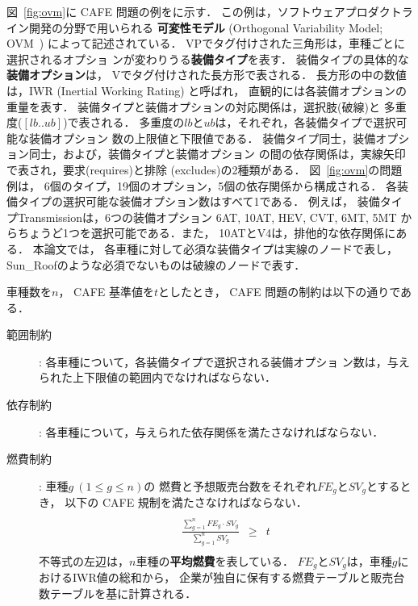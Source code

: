 
図~\ref{fig:ovm}に CAFE 問題の例をに示す．
この例は，ソフトウェアプロダクトライン開発の分野で用いられる
\textbf{可変性モデル} (Orthogonal Variability Model; OVM~\cite{Pohl05:sple})
によって記述されている．
%
\textsf{VP}でタグ付けされた三角形は，車種ごとに選択されるオプショ
ンが変わりうる\textbf{装備タイプ}を表す．
装備タイプの具体的な\textbf{装備オプション}は，
\textsf{V}でタグ付けされた長方形で表される．
長方形の中の数値は，IWR (Inertial Working Rating) と呼ばれ，
直観的には各装備オプションの重量を表す．
装備タイプと装備オプションの対応関係は，選択肢(破線)と
多重度($[lb..ub]$)で表される．
多重度の$lb$と$ub$は，それぞれ，各装備タイプで選択可能な装備オプション
数の上限値と下限値である．
装備タイプ同士，装備オプション同士，および，装備タイプと装備オプション
の間の依存関係は，実線矢印で表され，要求(\textsf{requires})と排除
(\textsf{excludes})の2種類がある．
%
図~\ref{fig:ovm}の問題例は，
6個のタイプ，19個のオプション，5個の依存関係から構成される．
各装備タイプの選択可能な装備オプション数はすべて1である．
例えば，
装備タイプ\textsf{Transmission}は，6つの装備オプション
\textsf{6AT},
\textsf{10AT},
\textsf{HEV},
\textsf{CVT},
\textsf{6MT},
\textsf{5MT}
からちょうど1つを選択可能である．また，
\textsf{10AT}と\textsf{V4}は，排他的な依存関係にある．
%
本論文では，
各車種に対して必須な装備タイプは実線のノードで表し，
\textsf{Sun\_Roof}のような必須でないものは破線のノードで表す．

車種数を$n$，
CAFE 基準値を$t$としたとき，
CAFE 問題の制約は以下の通りである．
\begin{description}
\item[範囲制約]: 各車種について，各装備タイプで選択される装備オプショ
    ン数は，与えられた上下限値の範囲内でなければならない．
\item[依存制約]: 各車種について，与えられた依存関係を満たさなければならない．
\item[燃費制約]: 車種$g\ (1\leq g\leq n)$の
  燃費と予想販売台数をそれぞれ$FE_{g}$と$SV_{g}$とするとき，
  以下の CAFE 規制を満たさなければならない．
  \[\begin{array}{lcr}
      & & \\
      \displaystyle\frac{\sum_{g=1}^{n} FE_{g}\cdot SV_{g}}{\sum_{g=1}^{n} SV_{g}}
      &
        \geq 
      &
        t \\
      & & 
    \end{array}\]
  不等式の左辺は，$n$車種の\textbf{平均燃費}を表している．
  $FE_{g}$と$SV_{g}$は，車種$g$におけるIWR値の総和から，
  企業が独自に保有する燃費テーブルと販売台数テーブルを基に計算される．
\end{description}

